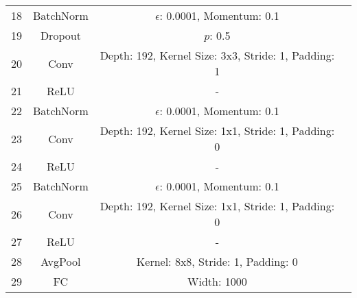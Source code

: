 \documentclass[10pt,twocolumn,letterpaper]{article}
\begin{document}
\begin{table}[ht]
\begin{tabular}{|l|c|c|r}
        \multirow{1}{0.5cm}{18} & BatchNorm & $\epsilon$: 0.0001, Momentum: 0.1\\
        \multirow{1}{0.5cm}{19} & Dropout & $p$: 0.5\\
        \multirow{1}{0.5cm}{20} & Conv & Depth: 192, Kernel Size: 3x3, Stride: 1, Padding: 1\\
        \multirow{1}{0.5cm}{21} & ReLU & -\\
        
        \multirow{1}{0.5cm}{22} & BatchNorm & $\epsilon$: 0.0001, Momentum: 0.1\\
        \multirow{1}{0.5cm}{23} & Conv & Depth: 192, Kernel Size: 1x1, Stride: 1, Padding: 0\\
        \multirow{1}{0.5cm}{24} & ReLU & -\\
        
        \multirow{1}{0.5cm}{25} & BatchNorm & $\epsilon$: 0.0001, Momentum: 0.1\\
        \multirow{1}{0.5cm}{26} & Conv & Depth: 192, Kernel Size: 1x1, Stride: 1, Padding: 0\\
        \multirow{1}{0.5cm}{27} & ReLU & -\\
        
        \multirow{1}{0.5cm}{28} & AvgPool & Kernel: 8x8, Stride: 1, Padding: 0\\
        \multirow{1}{0.5cm}{29} & FC & Width: 1000\\
        
        \hline
        

        \hline
        \bottomrule
    \end{tabular}
    \label{table:var_nin}
    \vspace{-2mm}
\end{table}
\end{document}
